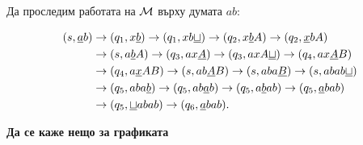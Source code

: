 \begin{example}
Да проследим работата на $\mathcal{M}$ върху думата $ab$:

\begin{align*}
  (s, \underline{a}b) & \to (q_1, x\underline{b}) \to (q_1,xb\underline{\sqcup}) \to (q_2, x\underline{b}A) \to (q_2, \underline{x}bA)\\
                      & \to (s, a\underline{b}A) \to (q_3, ax\underline{A}) \to (q_3, axA\underline{\sqcup}) \to (q_4, ax\underline{A}B)\\
                      & \to (q_4, a\underline{x}AB) \to (s, ab\underline{A}B) \to (s,aba\underline{B}) \to (s, abab\underline{\sqcup})\\
                      & \to (q_5, aba\underline{b}) \to (q_5, ab\underline{a}b) \to (q_5, a\underline{b}ab) \to (q_5, \underline{a}bab)\\
                      & \to (q_5, \underline{\sqcup}abab) \to (q_6, \underline{a}bab).
\end{align*}

  
\end{example}


{\bf Да се каже нещо за графиката}

